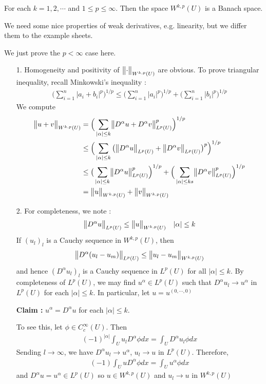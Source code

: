 \documentclass[10pt,a4paper]{report}
\newenvironment{proof}
{\begin{changemargin}{1cm}{0.5cm} 
	}%
	{\end{changemargin}
}
\newenvironment{subproof}
{\begin{changemargin}{0.5cm}{0.5cm} 
	}%
	{\end{changemargin}
}
\begin{document}
\thm  For each $k=1,2,\cdots$ and $1\leq p\leq \infty$. Then the space $W^{k,p}(U)$ is a Banach space.
\begin{proof}
We need some nice properties of weak derivatives, e.g. linearity, but we differ them to the example sheets.
\s

\pf We just prove the $p<\infty$ case here.
\begin{itemize}
\item[1.] Homogeneity and positivity of $\bigl\lVert\cdot\bigr\rVert_{W^{k,p}(U)}$ are obvious. To prove triangular inequality, recall Minkowski's inequality : 
\begin{align*}
\big( \sum_{i=1}^n |a_i + b_i|^p \big)^{1/p} \leq \big( \sum_{i=1}^n |a_i|^p \big)^{1/p} + \big( \sum_{i=1}^n |b_i|^p \big)^{1/p}
\end{align*}
We compute
\begin{align*}
\bigl\lVert u+v\bigr\rVert_{W^{k,p}(U)} &= \Big( \sum_{|\alpha| \leq k} \bigl\lVert D^{\alpha} u + D^{\alpha}v\bigr\rVert_{L^p (U)}^p \Big)^{1/p} \\
&\leq \Big( \sum_{|\alpha| \leq k} \big( \bigl\lVert D^{\alpha} u\bigr\rVert_{L^p (U)} + \bigl\lVert D^{\alpha} v\bigr\rVert_{L^p (U)} \big)^p \Big)^{1/p} \\
&\leq \big( \sum_{|\alpha| \leq k} \bigl\lVert D^{\alpha} u\bigr\rVert_{L^p (U)}^p \Big)^{1/p} + \Big( \sum_{|\alpha| \leq ks} \bigl\lVert D^{\alpha}v\bigr\rVert_{L^p (U)}^p \Big)^{1/p} \\
&= \bigl\lVert u\bigr\rVert_{W^{k,p}(U)} + \bigl\lVert v\bigr\rVert_{W^{k,p}(U)}
\end{align*}
\item[2.] For completeness, we note :
\begin{align*}
\bigl\lVert D^{\alpha} u\bigr\rVert_{L^p(U)} \leq \bigl\lVert u\bigr\rVert_{W^{k,p}(U)} \quad |\alpha| \leq k
\end{align*}
If $(u_l)_l$ is a Cauchy sequence in $W^{k,p}(U)$, then
\begin{align*}
\bigl\lVert D^{\alpha}(u_l - u_m)\bigr\rVert_{L^p(U)} \leq \bigl\lVert u_l -u_m\bigr\rVert_{W^{k,p}(U)}
\end{align*}
and hence $(D^{\alpha}u_l)_l$ is a Cauchy sequence in $L^p(U)$ for all $|\alpha| \leq k$. By completeness of $L^p (U)$, we may find $u^{\alpha} \in L^p(U)$ such that $D^{\alpha}u_l \rightarrow u^{\alpha}$ in $L^p(U)$ for each $|\alpha|\leq k$. In particular, let $u = u^{(0,\cdots, 0)}$
\begin{subproof}
\textbf{Claim : } $u^{\alpha} = D^{\alpha} u$ for each $|\alpha| \leq k$.

\pf To see this, let $\phi \in C^{\infty}_c(U)$. Then
\begin{align*}
(-1)^{|\alpha|} \int_U u_{l} D^{\alpha} \phi dx = \int_U D^{\alpha} u_l \phi dx
\end{align*}
Sending $l\rightarrow \infty$, we have $D^{\alpha} u_{l} \rightarrow u^{\alpha}$, $u_{l} \rightarrow u$ in $L^p(U)$. Therefore,
\begin{align*}
(-1) \int_U u D^{\alpha} \phi dx = \int_U u^{\alpha} \phi dx
\end{align*}
and $D^{\alpha} u = u^{\alpha} \in L^p(U)$ so $u\in W^{k,p}(U)$ and $u_l \rightarrow u$ in $W^{k,p}(U)$
\end{subproof}
\end{itemize}

\eop
\end{proof}
\s
\end{document}
